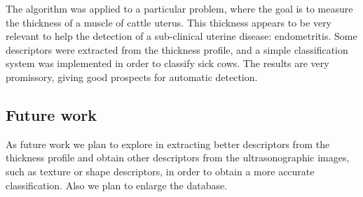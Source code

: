 \documentclass{article}
\begin{document}
The algorithm was applied to a particular problem, where the goal is to measure the thickness of a muscle of cattle uterus. This thickness appears to be very relevant to help the detection of a sub-clinical uterine disease: endometritis. Some descriptors were extracted from the thickness profile, and a simple classification system was implemented in order to classify sick cows. The results are very promissory, giving good prospects for automatic detection.

\subsection{Future work}
\label{ssec:future}
As future work we plan to explore in extracting better descriptors from the thickness profile and obtain other descriptors from the ultrasonographic images, such as texture or shape descriptors, in order to obtain a more accurate classification. Also we plan to enlarge the database.




\balance
\end{document}
